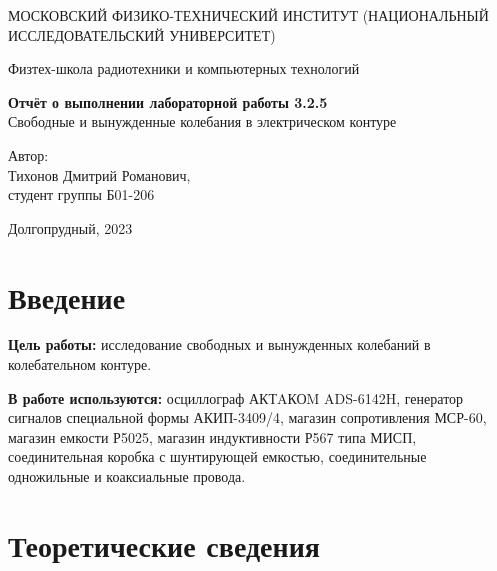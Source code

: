 \documentclass[a4paper, 12pt]{article}
\begin{document}
    \begin{titlepage}
	\begin{center}
            {\large МОСКОВСКИЙ ФИЗИКО-ТЕХНИЧЕСКИЙ ИНСТИТУТ (НАЦИОНАЛЬНЫЙ ИССЛЕДОВАТЕЛЬСКИЙ УНИВЕРСИТЕТ)}
	\end{center}
 
	\begin{center}
		{\large Физтех-школа радиотехники и компьютерных технологий}
	\end{center}
	
	\vspace{8cm}
	{\LARGE
		\begin{center}
                {\bf Отчёт о выполнении лабораторной работы 3.2.5}\\
                Свободные и вынужденные колебания в электрическом контуре
		\end{center}
	}
	\vspace{5cm}
	\begin{flushright}
		{\Large Автор:\\ Тихонов Дмитрий Романович, \\
			\vspace{0.2cm}
			студент группы Б01-206}
	\end{flushright}
	\vspace{5cm}
	\begin{center}
		\Large Долгопрудный, 2023
	\end{center}
    \end{titlepage}

    \section{Введение}

    \par \textbf{Цель работы:} исследование свободных и вынужденных колебаний в колебательном контуре. \\

    \par \textbf{В работе используются:} осциллограф АКТAКОM ADS-6142H, генератор сигналов специальной формы АКИП-3409/4, магазин сопротивления МСР-60, магазин емкости Р5025, магазин индуктивности Р567 типа МИСП, соединительная коробка с шунтирующей емкостью, соединительные одножильные и коаксиальные провода.
    
    \section{Теоретические сведения}
\end{document}
